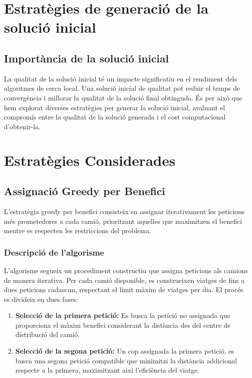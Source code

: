 \section{Estratègies de generació de la solució inicial}
\label{sec:initial}

\subsection{Importància de la solució inicial}

La qualitat de la solució inicial té un impacte significatiu en el rendiment dels algoritmes de cerca local. Una solució inicial de qualitat pot reduir el temps de convergència i millorar la qualitat de la solució final obtinguda. És per això que hem explorat diverses estratègies per generar la solució inicial, avaluant el compromís entre la qualitat de la solució generada i el cost computacional d'obtenir-la.

\section{Estratègies Considerades}

\subsection{Assignació Greedy per Benefici}

L'estratègia greedy per benefici consisteix en assignar iterativament les peticions més prometedores a cada camió, prioritzant aquelles que maximitzen el benefici mentre es respecten les restriccions del problema.

\subsubsection{Descripció de l'algorisme}

L'algorisme segueix un procediment constructiu que assigna peticions als camions de manera iterativa. Per cada camió disponible, es construeixen viatges de fins a dues peticions cadascun, respectant el límit màxim de viatges per dia. El procés es divideix en dues fases:

\begin{enumerate}
    \item \textbf{Selecció de la primera petició:} Es busca la petició no assignada que proporciona el màxim benefici considerant la distància des del centre de distribució del camió.
    
    \item \textbf{Selecció de la segona petició:} Un cop assignada la primera petició, es busca una segona petició compatible que minimitzi la distància addicional respecte a la primera, maximitzant així l'eficiència del viatge.
\end{enumerate}


